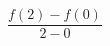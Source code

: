 \documentclass[preview]{standalone}
\begin{document}
\begin{align*}
\dfrac{f(2) - f(0)}{2 - 0}
\end{align*}
\end{document}
